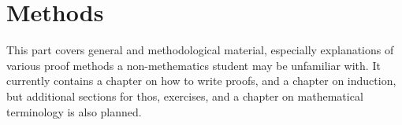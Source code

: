 \documentclass[../../include/open-logic-part]{subfiles}
\begin{document}
\part{Methods}

\begin{editorial}
  This part covers general and methodological material, especially
  explanations of various proof methods a non-methematics student may
  be unfamiliar with. It currently contains a chapter on how to write
  proofs, and a chapter on induction, but additional sections for
  thos, exercises, and a chapter on mathematical terminology is also
  planned.
\end{editorial}



\OLEndPartHook
\end{document}

